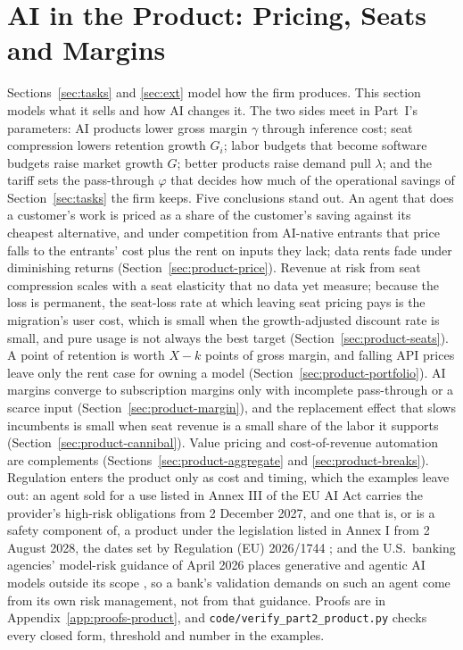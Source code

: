 \section{AI in the Product: Pricing, Seats and Margins}\label{sec:product}

Sections~\ref{sec:tasks} and \ref{sec:ext} model how the firm produces. This section models what it sells and how AI changes it. The two sides meet in Part~I's parameters: AI products lower gross margin $\gamma$ through inference cost; seat compression lowers retention growth $G_i$; labor budgets that become software budgets raise market growth $G$; better products raise demand pull $\lambda$; and the tariff sets the pass-through $\varphi$ that decides how much of the operational savings of Section~\ref{sec:tasks} the firm keeps. Five conclusions stand out. An agent that does a customer's work is priced as a share of the customer's saving against its cheapest alternative, and under competition from AI-native entrants that price falls to the entrants' cost plus the rent on inputs they lack; data rents fade under diminishing returns (Section~\ref{sec:product-price}). Revenue at risk from seat compression scales with a seat elasticity that no data yet measure; because the loss is permanent, the seat-loss rate at which leaving seat pricing pays is the migration's user cost, which is small when the growth-adjusted discount rate is small, and pure usage is not always the best target (Section~\ref{sec:product-seats}). A point of retention is worth $X-k$ points of gross margin, and falling API prices leave only the rent case for owning a model (Section~\ref{sec:product-portfolio}). AI margins converge to subscription margins only with incomplete pass-through or a scarce input (Section~\ref{sec:product-margin}), and the replacement effect that slows incumbents is small when seat revenue is a small share of the labor it supports (Section~\ref{sec:product-cannibal}). Value pricing and cost-of-revenue automation are complements (Sections~\ref{sec:product-aggregate} and \ref{sec:product-breaks}). Regulation enters the product only as cost and timing, which the examples leave out: an agent sold for a use listed in Annex III of the EU AI Act carries the provider's high-risk obligations from 2 December 2027, and one that is, or is a safety component of, a product under the legislation listed in Annex I from 2 August 2028, the dates set by Regulation (EU) 2026/1744 \citep{eu2024regulation,eu2026regulation}; and the U.S.\ banking agencies' model-risk guidance of April 2026 places generative and agentic AI models outside its scope \citep{fed2026sr262,occ2026bulletin13}, so a bank's validation demands on such an agent come from its own risk management, not from that guidance. Proofs are in Appendix~\ref{app:proofs-product}, and \texttt{code/verify\_part2\_product.py} checks every closed form, threshold and number in the examples.

